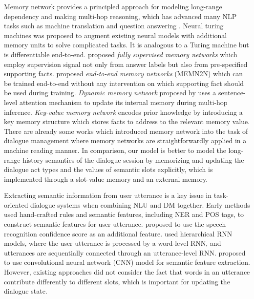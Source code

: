 Memory network provides a principled approach for modeling long-range dependency and making multi-hop reasoning, which has advanced many NLP tasks such as machine translation \cite{wang2016memory} and question answering \cite{sukhbaatar2015end}. Neural turing machines \cite{graves2014neural} was proposed to augment existing neural models with additional memory units to solve complicated tasks. It is analogous to a Turing machine but is differentiable end-to-end. \cite{weston2014memory} proposed \emph{fully supervised memory networks} which employ supervision signal not only from answer labels but also from pre-specified supporting facts. \cite{sukhbaatar2015end} proposed \emph{end-to-end memory networks} (MEMN2N) which can be trained end-to-end without any intervention on which supporting fact should be used during training. \emph{Dynamic memory network} proposed by \cite{kumar2016ask} uses a sentence-level attention mechanism to update its internal memory during multi-hop inference. \emph{Key-value memory network} \cite{miller2016key} encodes prior knowledge by introducing a key memory structure which stores facts to address to the relevant memory value. There are already some works which introduced memory network into the task of dialogue management \cite{perez2016dialog} where memory networks are straightforwardly applied in a machine reading manner. In comparison, our model is better to model the long-range history semantics of the dialogue session by memorizing and updating the dialogue act types and the values of semantic slots explicitly, which is implemented through a slot-value memory and an external memory.


Extracting semantic information from user utterance is a key issue in task-oriented dialogue systems when combining NLU and DM together.
Early methods used hand-crafted rules and semantic features, including NER and POS tags, to construct semantic features for user utterance. \cite{henderson2014word} proposed to use the speech recognition confidence score as an additional feature. \cite{serban2016building, serban2017hierarchical} used hierarchical RNN models, where the user utterance is processed by a word-level RNN, and utterances are sequentially connected through an utterance-level RNN. \cite{mrkvsic2016neural} proposed to use convolutional neural network (CNN) model for semantic feature extraction. However, existing approaches did not consider the fact that words in an utterance contribute differently to different slots,  which is important for updating the dialogue state.


